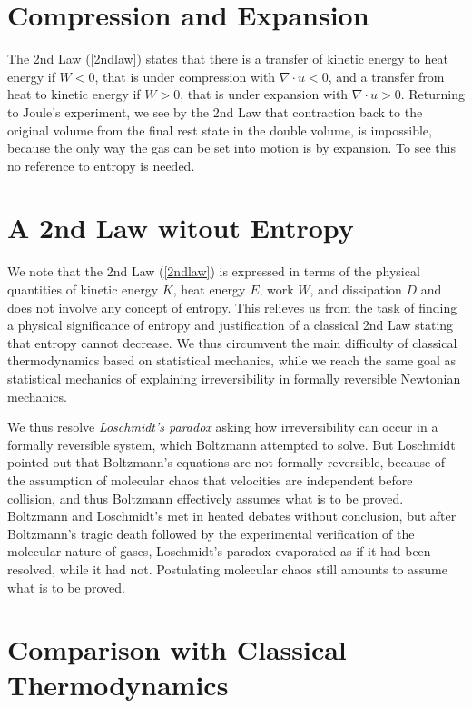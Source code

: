 \section{Compression and Expansion}

The 2nd Law (\ref{2ndlaw}) states that there is a transfer of kinetic
energy to heat energy if $W<0$, that is under compression with
$\nabla\cdot u<0$, and a transfer from heat to kinetic energy if
$W>0$, that is under expansion with $\nabla\cdot u>0$.  Returning to
Joule's experiment, we see by the 2nd Law that contraction back to the
original volume from the final rest state in the double volume, is
impossible, because the only way the gas can be set into motion is by
expansion. To see this no reference to entropy is needed.

\section{A 2nd Law witout Entropy}

We note that the 2nd Law (\ref{2ndlaw}) is expressed in terms of the
physical quantities of kinetic energy $K$, heat energy $E$, work $W$,
and dissipation $D$ and does not involve any concept of entropy.  This
relieves us from the task of finding a physical significance of
entropy and justification of a classical 2nd Law stating that entropy
cannot decrease.  We thus circumvent the main difficulty of classical
thermodynamics based on statistical mechanics, while we reach the same
goal as statistical mechanics of explaining irreversibility in
formally reversible Newtonian mechanics.

We thus resolve \emph{Loschmidt's paradox} \cite{loschmidt} asking how
irreversibility can occur in a formally reversible system, which
Boltzmann attempted to solve.  But Loschmidt pointed out that
Boltzmann's equations are not formally reversible, because of the
assumption of molecular chaos that velocities are independent before
collision, and thus Boltzmann effectively assumes what is to be
proved.  Boltzmann and Loschmidt's met in heated debates without
conclusion, but after Boltzmann's tragic death followed by the
experimental verification of the molecular nature of gases,
Loschmidt's paradox evaporated as if it had been resolved, while it
had not.  Postulating molecular chaos still amounts to assume what is
to be proved.

\section{Comparison with Classical Thermodynamics}

